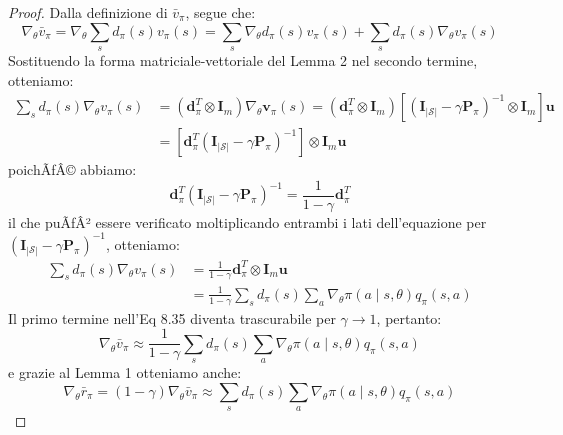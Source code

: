 ﻿\documentclass[11pt, a4paper]{report}
\begin{document}
\begin{proof}
Dalla definizione di $\bar{v}_{\pi}$, segue che:
\begin{equation}
\nabla_{\theta} \bar{v}_{\pi} = \nabla_{\theta} \sum_s d_{\pi}(s) v_{\pi}(s) = \sum_s \nabla_{\theta} d_{\pi}(s) v_{\pi}(s) + \sum_s d_{\pi}(s) \nabla_{\theta} v_{\pi}(s)
\end{equation}
Sostituendo la forma matriciale-vettoriale del Lemma 2 nel secondo termine, otteniamo:
\begin{align*}
\sum_s d_{\pi}(s) \nabla_{\theta} v_{\pi}(s) &= (\bm{d}_{\pi}^T \otimes \bm{I}_m) \nabla_{\theta} \bm{v}_{\pi}(s) = (\bm{d}_{\pi}^T \otimes \bm{I}_m) [(\bm{I}_{|\mathcal{S}|} - \gamma \bm{P}_{\pi})^{-1} \otimes \bm{I}_m] \bm{u} \\
&= [\bm{d}_{\pi}^T (\bm{I}_{|\mathcal{S}|} - \gamma \bm{P}_{\pi})^{-1}] \otimes \bm{I}_m \bm{u}
\end{align*}
poichÃƒÂ© abbiamo:
\begin{equation}
\bm{d}_{\pi}^T (\bm{I}_{|\mathcal{S}|} - \gamma \bm{P}_{\pi})^{-1} = \frac{1}{1 - \gamma} \bm{d}_{\pi}^T
\end{equation}
il che puÃƒÂ² essere verificato moltiplicando entrambi i lati dell'equazione per $(\bm{I}_{|\mathcal{S}|} - \gamma \bm{P}_{\pi})^{-1}$, otteniamo:
\begin{align*}
\sum_s d_{\pi}(s) \nabla_{\theta} v_{\pi}(s) &= \frac{1}{1 - \gamma} \bm{d}_{\pi}^T \otimes \bm{I}_m \bm{u} \\
&= \frac{1}{1 - \gamma} \sum_s d_{\pi}(s) \sum_a \nabla_{\theta} \pi(a \mid s, \theta) q_{\pi}(s, a)
\end{align*}
Il primo termine nell'Eq 8.35 diventa trascurabile per $\gamma \to 1$, pertanto:
\begin{equation}
\nabla_{\theta} \bar{v}_{\pi} \approx \frac{1}{1 - \gamma} \sum_s d_{\pi}(s) \sum_a \nabla_{\theta} \pi(a \mid s, \theta) q_{\pi}(s, a)
\end{equation}
e grazie al Lemma 1 otteniamo anche:
\begin{equation}
\nabla_{\theta} \bar{r}_{\pi} = (1 - \gamma) \nabla_{\theta} \bar{v}_{\pi} \approx \sum_s d_{\pi}(s) \sum_a \nabla_{\theta} \pi(a \mid s, \theta) q_{\pi}(s, a)
\end{equation}
\end{proof}
\end{document}
